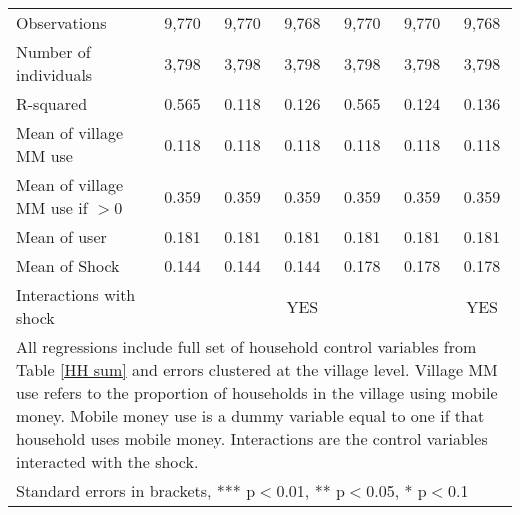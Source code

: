 \begin{table}
\begin{adjustwidth}{-1in}{-1in}
\begin{tabular}{lcccccc}
Observations & 9,770 & 9,770 & 9,768 & 9,770 & 9,770 & 9,768 \\
Number of individuals  & 3,798 & 3,798 & 3,798 & 3,798 & 3,798 & 3,798 \\
R-squared & 0.565 & 0.118 & 0.126 & 0.565 & 0.124 & 0.136 \\ \hline
Mean of village MM use  & 0.118 & 0.118 & 0.118 & 0.118 & 0.118 & 0.118 \\
Mean of village MM use if $>0$ & 0.359 & 0.359 & 0.359 & 0.359 & 0.359 & 0.359 \\
Mean of user & 0.181 & 0.181 & 0.181 & 0.181 & 0.181 & 0.181 \\
Mean of Shock & 0.144 & 0.144 & 0.144 & 0.178 & 0.178 & 0.178 \\
Interactions with shock &  &  & YES &  &  & YES \\ \hline
\multicolumn{7}{p{15cm}}{All regressions include full set of household control variables from Table \ref{HH sum} and errors clustered at the village level. Village MM use refers to the proportion of households in the village using mobile money. Mobile money use is a dummy variable equal to one if that household uses mobile money. Interactions are the control variables interacted with the shock.} \\
\multicolumn{7}{l}{ Standard errors in brackets, *** p$<$0.01, ** p$<$0.05, * p$<$0.1} 
\end{tabular}
 \end{adjustwidth}
 \end{table}
 
